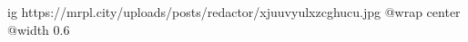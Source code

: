 
 
 
 
 

\ifcmt
  ig https://mrpl.city/uploads/posts/redactor/xjuuvyulxzcghucu.jpg
  @wrap center
  @width 0.6
\fi
